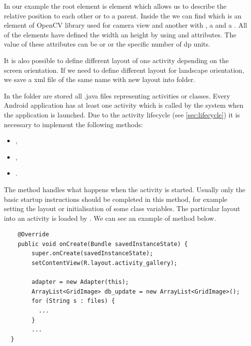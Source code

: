 In our example the root element is  element which allows us to describe the relative position to each other or to a parent.
Inside the  we can find  which is an element of OpenCV library used for camera view and 
another  with ,  a  and a .
All of the elements have defined the width an height by using  and  attributes.
The value of these attributes can be or  or the specific number of dp units.

It is also possible to define different layout of one activity depending on the screen orientation.
If we need to define different layout for landscape orientation, we save a xml file of the same name with new layout into  folder.

In the  folder are stored all .java files representing activities or classes.
Every Android application has at least one activity which is called by the system when the application is launched.
Due to the activity lifecycle (see \ref{sec:lifecycle}) it is necessary to implement the following methods:

\begin{itemize}
\item {},
\item {},
\item {}.
\end{itemize}

The  method handles what happens when the activity is started.
Usually only the basic startup instructions should be completed in this method, for example setting the layout or initialisation of some class variables.
The particular layout into an activity is loaded by .
We can see an example of  method below.

\begin{lstlisting}
    @Override
    public void onCreate(Bundle savedInstanceState) {
        super.onCreate(savedInstanceState);
        setContentView(R.layout.activity_gallery);
        
        adapter = new Adapter(this);
        ArrayList<GridImage> db_update = new ArrayList<GridImage>();
        for (String s : files) {
          ...
        }
        ...
  }
\end{lstlisting}

